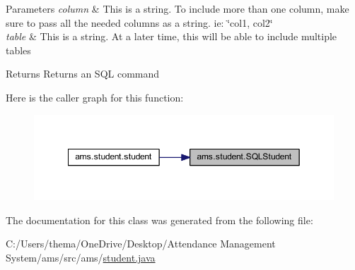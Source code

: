 \begin{DoxyParams}{Parameters}
{\em column} & This is a string. To include more than one column, make sure to pass all the needed columns as a string. ie\+: \char`\"{}col1, col2\char`\"{} \\
\hline
{\em table} & This is a string. At a later time, this will be able to include multiple tables \\
\hline
\end{DoxyParams}
\begin{DoxyReturn}{Returns}
Returns an S\+QL command 
\end{DoxyReturn}
Here is the caller graph for this function\+:\nopagebreak
\begin{figure}[H]
\begin{center}
\leavevmode
\includegraphics[width=349pt]{classams_1_1student_aaf15213b221829a2c44c15a859af9da2_icgraph}
\end{center}
\end{figure}


The documentation for this class was generated from the following file\+:\begin{DoxyCompactItemize}
\item 
C\+:/\+Users/thema/\+One\+Drive/\+Desktop/\+Attendance Management System/ams/src/ams/\mbox{\hyperlink{student_8java}{student.\+java}}\end{DoxyCompactItemize}
